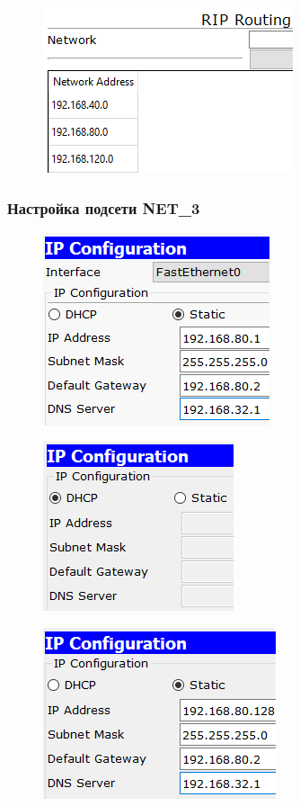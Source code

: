 \documentclass[14pt,a4paper,report]{report}
\begin{document}
\clearpage

\begin{figure}[h!]
	\centering
	\includegraphics[scale = 0.85]{images/4_4.png}
\end{figure}

\subsubsection{Настройка подсети NET\_3}

\begin{figure}[h!]
	\centering
	\includegraphics[scale = 0.85]{images/5_1.png}
\end{figure}

\begin{figure}[h!]
	\centering
	\includegraphics[scale = 0.85]{images/5_2.png}
\end{figure}

\begin{figure}[h!]
	\centering
	\includegraphics[scale = 0.85]{images/5_3.png}
\end{figure}
\end{document}
